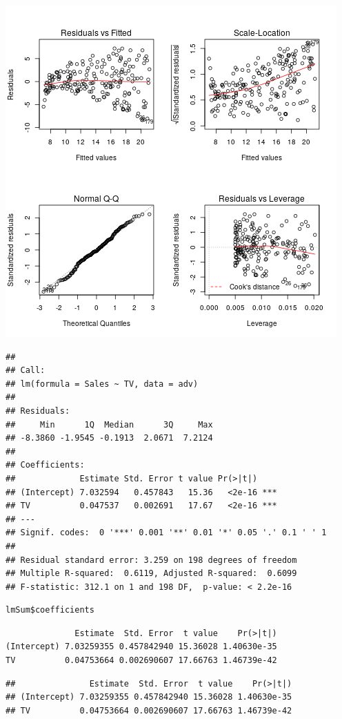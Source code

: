 \documentclass[11pt]{article}
\begin{document}
\begin{center}
\includegraphics[width=.9\linewidth]{Intro02AdvPlotLinMod.png}
\end{center}


\begin{verbatim}
##
## Call:
## lm(formula = Sales ~ TV, data = adv)
##
## Residuals:
##     Min      1Q  Median      3Q     Max
## -8.3860 -1.9545 -0.1913  2.0671  7.2124
##
## Coefficients:
##             Estimate Std. Error t value Pr(>|t|)
## (Intercept) 7.032594   0.457843   15.36   <2e-16 ***
## TV          0.047537   0.002691   17.67   <2e-16 ***
## ---
## Signif. codes:  0 '***' 0.001 '**' 0.01 '*' 0.05 '.' 0.1 ' ' 1
##
## Residual standard error: 3.259 on 198 degrees of freedom
## Multiple R-squared:  0.6119, Adjusted R-squared:  0.6099
## F-statistic: 312.1 on 1 and 198 DF,  p-value: < 2.2e-16
\end{verbatim}

\begin{verbatim}
lmSum$coefficients
\end{verbatim}

\begin{verbatim}
              Estimate  Std. Error  t value    Pr(>|t|)
(Intercept) 7.03259355 0.457842940 15.36028 1.40630e-35
TV          0.04753664 0.002690607 17.66763 1.46739e-42
\end{verbatim}


\begin{verbatim}
##               Estimate  Std. Error  t value    Pr(>|t|)
## (Intercept) 7.03259355 0.457842940 15.36028 1.40630e-35
## TV          0.04753664 0.002690607 17.66763 1.46739e-42
\end{verbatim}
\end{document}
